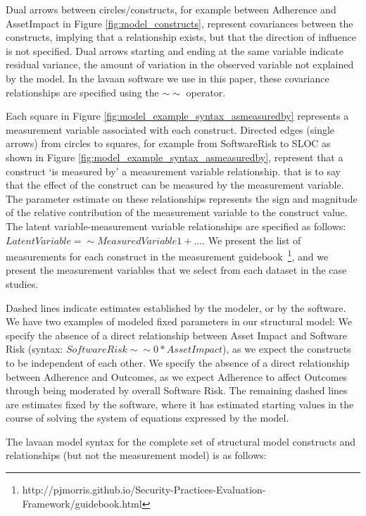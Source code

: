 Dual arrows between circles/constructs, for example between Adherence and AssetImpact in Figure \ref{fig:model_constructs}, represent covariances between the constructs, implying that a relationship exists, but that the direction of influence is not specified. Dual arrows starting and ending at the same variable indicate residual variance, the amount of variation in the observed variable not explained by the model. In the lavaan software we use in this paper, these covariance relationships are specified using the $\sim\sim$ operator.

Each square in Figure \ref{fig:model_example_syntax_asmeasuredby} represents a measurement variable associated with each construct. Directed edges (single arrows) from circles to squares, for example from SoftwareRisk to SLOC as shown in Figure \ref{fig:model_example_syntax_asmeasuredby}, represent that a construct `is measured by' a measurement variable relationship. that is to say that the effect of the construct can be measured by the measurement variable. The parameter estimate on these relationships represents the sign and magnitude of the relative contribution of the measurement variable to the construct value. The latent variable-measurement variable relationships are specified as follows: $LatentVariable =\sim MeasuredVariable1 + ...$. We present the list of measurements for each construct in the measurement guidebook~\footnote{http://pjmorris.github.io/Security-Practices-Evaluation-Framework/guidebook.html}, and we present the measurement variables that we select from each dataset in the case studies.  

Dashed lines indicate estimates established by the modeler, or by the software. We have two examples of modeled fixed parameters in our structural model: We specify the absence of a direct relationship between Asset Impact and Software Risk (syntax: $SoftwareRisk \sim\sim 0*AssetImpact$), as we expect the constructs to be independent of each other. We specify the absence of a direct relationship between Adherence and Outcomes, as we expect Adherence to affect Outcomes through being moderated by overall Software Risk. The remaining dashed lines are estimates fixed by the software, where it has estimated starting values in the course of solving the system of equations expressed by the model. 

The lavaan model syntax for the complete set of structural model constructs and relationships (but not the measurement model) is as follows:
 
